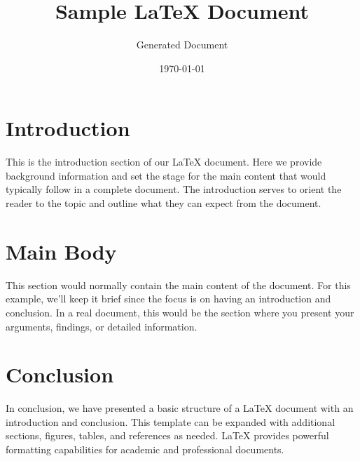 \documentclass{article}
\title{Sample LaTeX Document}
\author{Generated Document}
\date{\today}
\begin{document}
\maketitle

\section{Introduction}
This is the introduction section of our LaTeX document. Here we provide background information and set the stage for the main content that would typically follow in a complete document. The introduction serves to orient the reader to the topic and outline what they can expect from the document.

\section{Main Body}
This section would normally contain the main content of the document. For this example, we'll keep it brief since the focus is on having an introduction and conclusion. In a real document, this would be the section where you present your arguments, findings, or detailed information.

\section{Conclusion}
In conclusion, we have presented a basic structure of a LaTeX document with an introduction and conclusion. This template can be expanded with additional sections, figures, tables, and references as needed. LaTeX provides powerful formatting capabilities for academic and professional documents.
\end{document}
